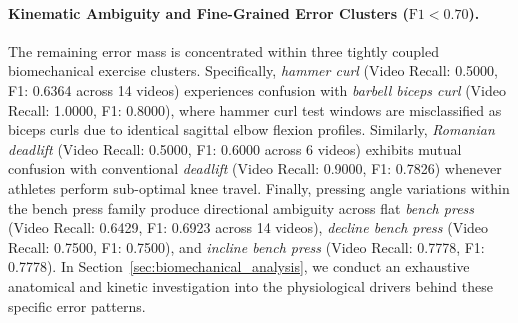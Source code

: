 \documentclass[runningheads]{llncs}
\begin{document}
\paragraph{Kinematic Ambiguity and Fine-Grained Error Clusters ($\text{F1} < 0.70$).} The remaining error mass is concentrated within three tightly coupled biomechanical exercise clusters. Specifically, \textit{hammer curl} (Video Recall: 0.5000, F1: 0.6364 across 14 videos) experiences confusion with \textit{barbell biceps curl} (Video Recall: 1.0000, F1: 0.8000), where hammer curl test windows are misclassified as biceps curls due to identical sagittal elbow flexion profiles. Similarly, \textit{Romanian deadlift} (Video Recall: 0.5000, F1: 0.6000 across 6 videos) exhibits mutual confusion with conventional \textit{deadlift} (Video Recall: 0.9000, F1: 0.7826) whenever athletes perform sub-optimal knee travel. Finally, pressing angle variations within the bench press family produce directional ambiguity across flat \textit{bench press} (Video Recall: 0.6429, F1: 0.6923 across 14 videos), \textit{decline bench press} (Video Recall: 0.7500, F1: 0.7500), and \textit{incline bench press} (Video Recall: 0.7778, F1: 0.7778). In Section~\ref{sec:biomechanical_analysis}, we conduct an exhaustive anatomical and kinetic investigation into the physiological drivers behind these specific error patterns.
\end{document}
